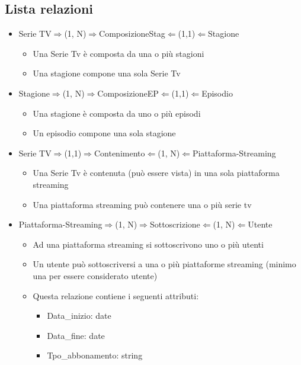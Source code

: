 \documentclass[10pt,a4paper]{article}
\begin{document}
\subsection{Lista relazioni}
\begin{itemize}
    \item Serie TV$\Rightarrow$(1, N)$\Rightarrow$ComposizioneStag$\Leftarrow$(1,1)$\Leftarrow$Stagione 
    \begin{itemize}
        \item Una Serie Tv è composta da una o più stagioni
        \item Una stagione compone una sola Serie Tv 
    \end{itemize}
    \item Stagione$\Rightarrow$(1, N)$\Rightarrow$ComposizioneEP$\Leftarrow$(1,1)$\Leftarrow$Episodio
    \begin{itemize}
        \item Una stagione è composta da uno o più episodi
        \item Un episodio compone una sola stagione
    \end{itemize}
    \item Serie TV$\Rightarrow$(1,1)$\Rightarrow$Contenimento$\Leftarrow$(1, N)$\Leftarrow$Piattaforma-Streaming
    \begin{itemize}
        \item Una Serie Tv è contenuta (può essere vista) in una sola piattaforma streaming
        \item Una piattaforma streaming può contenere una o più serie tv 
    \end{itemize}
    \item Piattaforma-Streaming$\Rightarrow$(1, N)$\Rightarrow$Sottoscrizione$\Leftarrow$(1, N)$\Leftarrow$Utente
    \begin{itemize}
        \item Ad una piattaforma streaming si sottoscrivono uno o più utenti
        \item Un utente può sottoscriversi a una o più piattaforme streaming (minimo una per essere considerato utente)
        \item Questa relazione contiene i seguenti attributi:
        \begin{itemize}
            \item Data\_inizio: date
            \item Data\_fine: date
            \item Tpo\_abbonamento: string
        \end{itemize}

\end{itemize}
\end{itemize}
\end{document}
